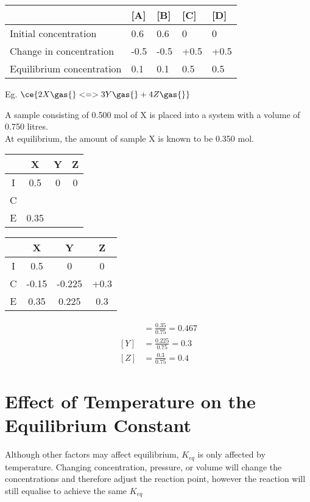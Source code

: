 	\begin{table}[htbp]
		\centering
		\begin{tabular}{lllll}
			\hline
			 & [A] & [B] & [C] & [D]  \\ \hline
			Initial concentration 		& 0.6 & 0.6 & 0 & 0 \\
			Change in concentration 	& -0.5 & -0.5 & +0.5 & +0.5 \\
			Equilibrium concentration 	& 0.1 & 0.1 & 0.5 & 0.5 \\ \hline
		\end{tabular}
	\end{table}

	Eg. $\ce{2X \gas{} <=> 3Y \gas{} + 4Z \gas{}}$

	A sample consisting of 0.500 mol of X is placed into a system with a volume of 0.750 litres. \\
	At equilibrium, the amount of sample X is known to be 0.350 mol.

	\begin{table}[htbp]
		\centering
		\begin{tabular}{cccc}
			\hline
			 & X & Y & Z \\ \hline
			I 		& 0.5 & 0 & 0 \\
			C 		&  &  & \\
			E 		& 0.35 &  &  \\ \hline
		\end{tabular}
	\end{table}

	\begin{table}[htbp]
		\centering
		\begin{tabular}{cccc}
			\hline
			 	& X & Y & Z \\ \hline
			I 		& 0.5 & 0 & 0 \\
			C 		& -0.15 & -0.225 & +0.3 \\
			E 		& 0.35 & 0.225 & 0.3 \\ \hline
		\end{tabular}
	\end{table}

	\begin{align*}
		[X] &= \frac{0.35}{0.75} = 0.467 \\
		[Y] &= \frac{0.225}{0.75} = 0.3 \\
		[Z] &= \frac{0.3}{0.75} = 0.4
	\end{align*}
	
\section{Effect of Temperature on the Equilibrium Constant} \label{8/11/2024}
	Although other factors may affect equilibrium, $K_{eq}$ is only affected by temperature.
	Changing concentration, pressure, or volume will change the concentrations and therefore adjust the reaction point, however the reaction will still equalise to achieve the same $K_{eq}$

